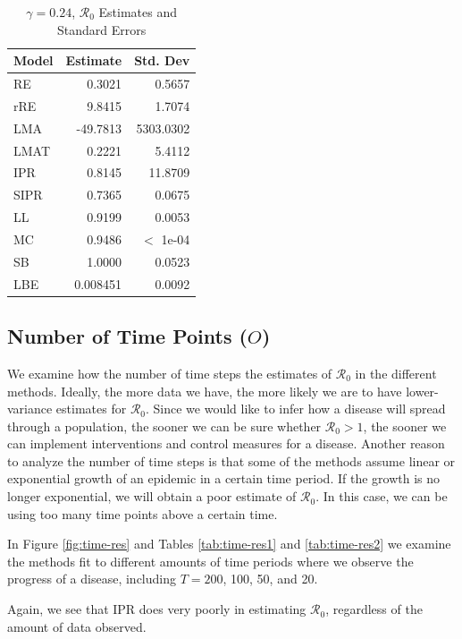\documentclass[12pt]{article}
\newcommand{\rr}{\ensuremath{\mathcal{R}_0}}
\begin{document}
\begin{table}[H]
	
	\centering
	\begin{tabular}[t]{l|r|r}
		\hline
		Model & Estimate & Std. Dev\\
		\hline
		RE & 0.3021 & 0.5657\\
		\hline
		rRE & 9.8415 & 1.7074\\
		\hline
		LMA & -49.7813 & 5303.0302\\
		\hline
		LMAT & 0.2221 & 5.4112\\
		\hline
		IPR & 0.8145 & 11.8709\\
		\hline
		SIPR & 0.7365 & 0.0675\\
		\hline
		LL & 0.9199 & 0.0053\\
		\hline
		MC & 0.9486 & $<$ 1e-04\\
		\hline
		SB & 1.0000 & 0.0523\\
		\hline
		LBE & 0.008451 & 0.0092\\
		\hline
	\end{tabular}
	\caption{$\gamma = 0.24$, $\rr$ Estimates and Standard Errors}
\end{table}

\subsection{Number of Time Points ($O$)}\label{sec:res-time}
We examine how the number of time steps the estimates of $\rr$ in the different methods.  Ideally, the more data we have, the more likely we are to have lower-variance estimates for $\rr$.  Since we would like to  infer how a disease will spread through a population, the sooner we can be sure whether $\rr> 1$, the sooner we can implement interventions and control measures for a disease.  Another reason to analyze the number of time steps is that some of the methods assume linear or exponential growth of an epidemic in a certain time period.  If the growth is no longer exponential, we will obtain a poor estimate of $\rr$.  In this case, we can be using too many time points above a certain time.

In Figure \ref{fig:time-res} and Tables \ref{tab:time-res1} and \ref{tab:time-res2} we examine the methods fit to different amounts of time periods where we observe the progress of a disease, including $T=200$, 100, 50, and 20.

Again, we see that IPR does very poorly in estimating $\rr$, regardless of the amount of data observed.
\end{document}
